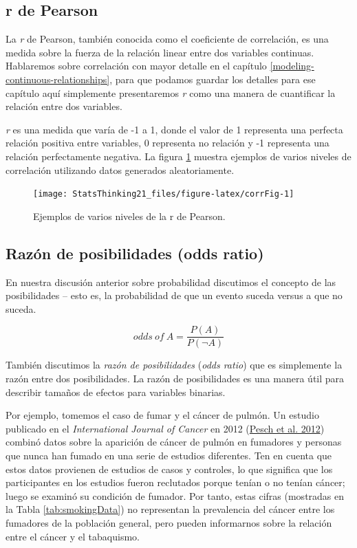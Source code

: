 \documentclass[
  12pt,
]{book}
\begin{document}
\hypertarget{r-de-pearson}{%
\subsection{r de Pearson}\label{r-de-pearson}}

La \emph{r} de Pearson, también conocida como el coeficiente de correlación, es una medida sobre la fuerza de la relación linear entre dos variables continuas. Hablaremos sobre correlación con mayor detalle en el capítulo \ref{modeling-continuous-relationships}, para que podamos guardar los detalles para ese capítulo aquí simplemente presentaremos \emph{r} como una manera de cuantificar la relación entre dos variables.

\emph{r} es una medida que varía de -1 a 1, donde el valor de 1 representa una perfecta relación positiva entre variables, 0 representa no relación y -1 representa una relación perfectamente negativa. La figura \ref{fig:corrFig} muestra ejemplos de varios niveles de correlación utilizando datos generados aleatoriamente.

\begin{figure}
\texttt{[image: StatsThinking21\_files/figure-latex/corrFig-1]} \caption{Ejemplos de varios niveles de la r de Pearson.}\label{fig:corrFig}
\end{figure}

\hypertarget{razuxf3n-de-posibilidades-odds-ratio}{%
\subsection{Razón de posibilidades (odds ratio)}\label{razuxf3n-de-posibilidades-odds-ratio}}

En nuestra discusión anterior sobre probabilidad discutimos el concepto de las posibilidades -- esto es, la probabilidad de que un evento suceda versus a que no suceda.

\[
odds\ of\ A = \frac{P(A)}{P(\neg A)}
\]

También discutimos la \emph{razón de posibilidades} (\emph{odds ratio}) que es simplemente la razón entre dos posibilidades. La razón de posibilidades es una manera útil para describir tamaños de efectos para variables binarias.

Por ejemplo, tomemos el caso de fumar y el cáncer de pulmón. Un estudio publicado en el \emph{International Journal of Cancer} en 2012 (\protect\hyperlink{ref-pesc:kend:gust:2012}{Pesch et al. 2012}) combinó datos sobre la aparición de cáncer de pulmón en fumadores y personas que nunca han fumado en una serie de estudios diferentes. Ten en cuenta que estos datos provienen de estudios de casos y controles, lo que significa que los participantes en los estudios fueron reclutados porque tenían o no tenían cáncer; luego se examinó su condición de fumador. Por tanto, estas cifras (mostradas en la Tabla \ref{tab:smokingData}) no representan la prevalencia del cáncer entre los fumadores de la población general, pero pueden informarnos sobre la relación entre el cáncer y el tabaquismo.
\end{document}
